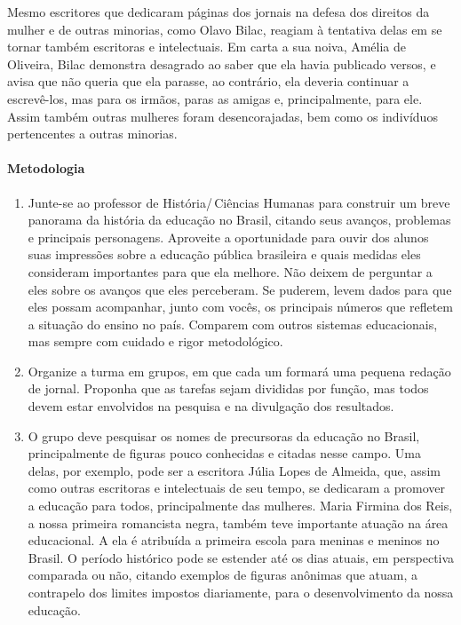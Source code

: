 \documentclass[12pt]{extarticle}
\begin{document}
Mesmo escritores que dedicaram páginas dos jornais na defesa dos
direitos da mulher e de outras minorias, como Olavo Bilac, reagiam à
tentativa delas em se tornar também escritoras e intelectuais. Em carta
a sua noiva, Amélia de Oliveira, Bilac demonstra desagrado ao saber que
ela havia publicado versos, e avisa que não queria que ela parasse, ao
contrário, ela deveria continuar a escrevê-los, mas para os irmãos,
paras as amigas e, principalmente, para ele. Assim também outras
mulheres foram desencorajadas, bem como os indivíduos pertencentes a
outras minorias.

\paragraph{Metodologia} 
\begin{enumerate}
\item
Junte-se ao professor de História/\,Ciências Humanas para construir 
um breve panorama da história da
educação no Brasil, citando seus avanços, problemas e principais
personagens. Aproveite a oportunidade para ouvir dos alunos suas
impressões sobre a educação pública brasileira e quais medidas eles
consideram importantes para que ela melhore. Não deixem de perguntar a
eles sobre os avanços que eles perceberam. Se puderem, levem dados
para que eles possam acompanhar, junto com vocês,
os principais números que refletem a situação do ensino no país. Comparem
com outros sistemas educacionais, mas sempre com cuidado e rigor
metodológico.

\item
Organize a turma em grupos, em que cada um formará uma pequena
redação de jornal. Proponha que as tarefas sejam divididas por função,
mas todos devem estar envolvidos na pesquisa e na divulgação dos
resultados.

\item
O grupo deve pesquisar os nomes de precursoras da educação no Brasil,
principalmente de figuras pouco conhecidas e citadas nesse campo. Uma
delas, por exemplo, pode ser a escritora Júlia Lopes de Almeida, que,
assim como outras escritoras e intelectuais de seu tempo, se dedicaram a
promover a educação para todos, principalmente das mulheres. Maria
Firmina dos Reis, a nossa primeira romancista negra, também teve
importante atuação na área educacional. A ela é atribuída a primeira
escola para meninas e meninos no Brasil. O período histórico pode se
estender até os dias atuais, em perspectiva comparada ou não, citando
exemplos de figuras anônimas que atuam, a contrapelo dos limites
impostos diariamente, para o desenvolvimento da nossa educação.


\end{enumerate}
\end{document}
